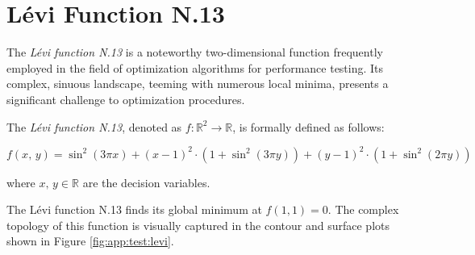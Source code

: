 \section{Lévi Function N.13}
\label{sec:app:test:levi}
  The \emph{Lévi function N.13} is a noteworthy two-dimensional function 
  frequently employed in the field of optimization algorithms for performance 
  testing. 
  Its complex, sinuous landscape, teeming with numerous local minima, presents a 
  significant challenge to optimization procedures.

  \begin{definition}
    \label{def:app:test:levi}
    The \emph{Lévi function N.13}, denoted as \(f: \mathbb{R}^2 \rightarrow 
    \mathbb{R}\), is formally defined as follows:

    \begin{equation}
      \label{eq:app:test:levi}
      f(x,\, y) = \sin^2(3\pi x) 
        + (x - 1)^2 \cdot (1 + \sin^2(3\pi y)) 
        + (y - 1)^2 \cdot (1 + \sin^2(2\pi y))
    \end{equation}
    
    where \(x,\, y \in \mathbb{R}\) are the decision variables.
  \end{definition}

  The Lévi function N.13 finds its global minimum at \(f(1, 1) = 0\). 
  The complex topology of this function is visually captured in the contour and 
  surface plots shown in Figure \ref{fig:app:test:levi}.

